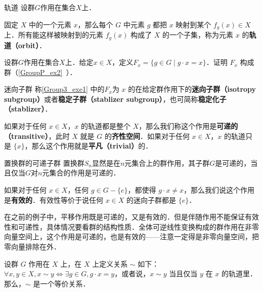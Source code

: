 \begin{definition}{轨道}
设群$G$作用在集合$X$上．

固定 $X$ 中的一个元素 $x$，那么每个 $G$ 中元素 $g$ 都把 $x$ 映射到某个 $f_g(x)\in X$ 上．所有能这样被映射到的元素 $f_g(x)$ 构成了 $X$ 的一个子集，称为元素 $x$ 的\textbf{轨道（orbit）}．
\end{definition}




\begin{exercise}{}\label{Group3_exe1}
设群$G$作用在集合$X$上．给定$x\in X$，定义$F_x=\{g\in G\mid g\cdot x=x\}$．证明 $F_x$ 构成群（\autoref{GroupP_ex2}~）．
\end{exercise}




\begin{definition}{迷向子群}
称\autoref{Group3_exe1} 中的$F_x$为 $x$ 的在给定群作用下的\textbf{迷向子群（isotropy subgroup）}或者\textbf{稳定子群（stablizer subgroup）}，也可简称\textbf{稳定化子（stablizer）}．
\end{definition}






\begin{definition}{}
如果对于任何 $x\in X$，$x$ 的轨道都是整个 $X$，那么我们称这个作用是\textbf{可递的（transitive）}，此时 $X$ 就是 $G$ 的\textbf{齐性空间}．如果对于任何 $x\in X$，$x$ 的轨道只是 $\{x\}$，那么这个作用就是\textbf{平凡（trivial）}的．
\end{definition}

\begin{example}{置换群的可递子群}\label{Group3_ex4}
置换群$S_n$显然是在$n$元集合上的群作用，其子群$G$是可递的，当且仅当$G$对$n$元集合的作用是可递的．
\end{example}

如果对于任何 $x\in X$，任何 $g\in G-\{e\}$，都使得 $g\cdot x\not=x$，那么我们说这个作用是\textbf{有效的}．有效性等价于说任何 $x\in X$ 的迷向子群都是 $\{e\}$．

在之前的例子中，平移作用既是可递的，又是有效的．但是伴随作用不能保证有效性和可递性，具体情况要看群的结构性质．全体可逆线性变换构成的群作用在非零向量空间上，这个作用是可递的，也是有效的——注意一定得是非零向量空间，把零向量排除在外．

\begin{theorem}{}\label{Group3_the1}
设群 $G$ 作用在 $X$ 上，在 $X$ 上定义关系 $\sim$ 如下：$\forall x, y\in X, x\sim y \iff \exists g\in G, g\cdot x=y$，或者说，$x\sim y$ 当且仅当 $y$ 在 $x$ 的轨道里．那么，$\sim$ 是一个等价关系．
\end{theorem}

